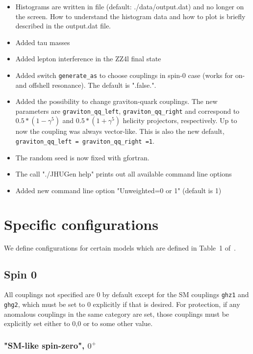 \documentclass[aps,superscriptaddress,nofootinbib]{revtex4}
\begin{document}
\begin{itemize}
\item Histograms are written in file (default: ./data/output.dat) and no longer on the screen.  How to understand the histogram data and how to plot is briefly described in the output.dat file.
\item Added tau masses
\item Added lepton interference in the ZZ4l final state
\item Added switch \verb|generate_as| to choose couplings in spin-0 case (works for on- and offshell resonance). The default is ".false.".
\item Added the possibility to change graviton-quark couplings. The new parameters are \verb|graviton_qq_left|, \verb|graviton_qq_right| and correspond to $0.5*(1-\gamma^5)$ and $0.5*(1+\gamma^5)$ helicity projectors, respectively. Up to now the coupling was always vector-like. This is also the new default, \verb|graviton_qq_left = graviton_qq_right =1|.
\item The random seed is now fixed with gfortran.
\item The call "./JHUGen help" prints out all available command line options
\item Added new command line option "Unweighted=0 or 1" (default is 1)
\end{itemize}

\clearpage
\appendix


\section{Specific configurations}

We define configurations for certain models which are defined in Table~1 of~\cite{Bolognesi:2012}.

\subsection{Spin 0}
All couplings not specified are 0 by default except for the SM couplings \verb|ghz1| and \verb|ghg2|, which must be set to 0 explicitly if that is desired.  For protection, if any anomalous couplings in the same category are set, those couplings must be explicitly set either to 0,0 or to some other value.

\subsubsection{"SM-like spin-zero", $0^+$}
\end{document}

